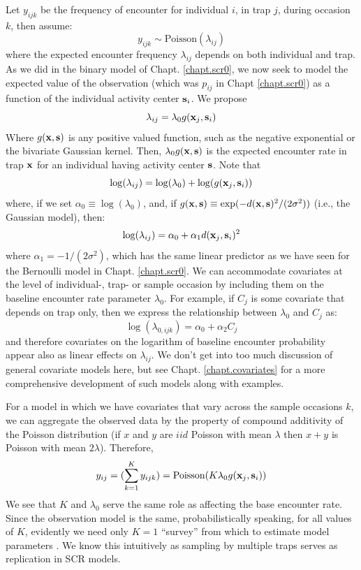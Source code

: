 Let $y_{ijk}$ be the frequency of encounter for
individual $i$, in trap $j$, during occasion $k$, then assume:
\[
 y_{ijk} \sim \mbox{Poisson}(\lambda_{ij})
\]
where the expected encounter frequency $\lambda_{ij}$ depends on both
individual and trap. As we did in the binary model of
Chapt. \ref{chapt.scr0}, we
now seek to model the expected value of the observation (which was
$p_{ij}$ in Chapt \ref{chapt.scr0}) as a function of the individual activity center
${\bf s}_{i}$.
We propose
\[
 \lambda_{ij} = \lambda_{0}  g({\bf x}_{j},{\bf s}_{i})
\]
Where $g({\bf x},{\bf s})$ is any positive valued function, such as
the negative exponential or the bivariate Gaussian kernel.
Then, $\lambda_{0}g({\bf x},{\bf s})$ is the expected encounter rate in trap
${\bf x}$ for an individual having activity center ${\bf s}$.  Note
that
\[
 \log(\lambda_{ij}) = \log(\lambda_{0}) + \log(  g({\bf x}_{j},{\bf
   s}_{i}) )
\]
where, if we set $\alpha_{0} \equiv \log(\lambda_{0})$, and, if 
$g({\bf x},{\bf s}) \equiv \exp(-  d({\bf x},{\bf s})^2 /(2\sigma^2))$
(i.e., the Gaussian model), then:
\begin{equation}
 \log(\lambda_{ij}) = \alpha_{0} + \alpha_{1} d({\bf x}_{j},{\bf s}_{i})^{2}
\label{poisson-mn.eq.lp}
\end{equation}
where $\alpha_{1} = -1/(2\sigma^2)$, 
which has the same linear predictor as we have seen for the Bernoulli
model in Chapt. \ref{chapt.scr0}.  We can accommodate covariates at
the level of individual-, trap- or sample occasion by including them
on the baseline encounter rate parameter $\lambda_{0}$. For example,
if $C_{j}$ is some covariate that depends on trap only, then we
express the relationship between $\lambda_{0}$ and $C_{j}$ as:
\[
\log(\lambda_{0,ijk}) = \alpha_{0} + \alpha_{2} C_{j}
\]
and therefore covariates on the logarithm of baseline encounter
probability appear also as linear effects on $\lambda_{ij}$.  We don't
get into too much discussion of general covariate models here, but see
Chapt. \ref{chapt.covariates} for a more comprehensive development of
such models along with examples. 


For a  model in which we have covariates that vary across
the sample occasions  $k$, we can aggregate the observed data by the
property of compound additivity of the Poisson distribution (if $x$ and
$y$ are $iid$ Poisson with mean $\lambda$ then $x+y$ is Poisson with
mean $2\lambda$). Therefore,
\[
y_{ij} = (\sum_{k=1}^{K} y_{ijk}) =  \mbox{Poisson}(K  \lambda_{0}
g({\bf x}_{j},{\bf s}_{i}) )
\]
We see that $K$ and $\lambda_{0}$ serve the same role as affecting the
base encounter rate. Since the observation model is the same,
probabilistically speaking, for all values of $K$, evidently we need
only $K=1$ ``survey'' from which to estimate model parameters \citep{efford_etal:2009ecol}. We know
this intuitively as sampling by multiple traps serves as replication
in SCR models.


